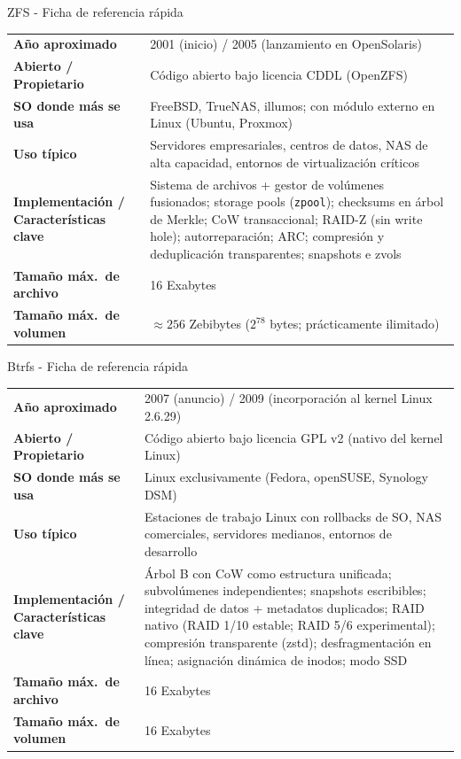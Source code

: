 \documentclass[12pt,letterpaper]{article}
\begin{document}
\begin{fichabox}{ZFS - Ficha de referencia rápida}
  \begin{tabular}{>{\bfseries}p{4.5cm} p{9cm}}
    Año aproximado & 2001 (inicio) / 2005 (lanzamiento en OpenSolaris) \\[4pt]
    Abierto / Propietario & Código abierto bajo licencia CDDL (OpenZFS) \\[4pt]
    SO donde más se usa & FreeBSD, TrueNAS, illumos; con módulo externo en Linux (Ubuntu, Proxmox) \\[4pt]
    Uso típico & Servidores empresariales, centros de datos, NAS de alta capacidad, entornos de virtualización críticos \\[4pt]
    Implementación / Características clave & Sistema de archivos + gestor de volúmenes fusionados; storage pools (\texttt{zpool}); checksums en árbol de Merkle; CoW transaccional; RAID-Z (sin write hole); autorreparación; ARC; compresión y deduplicación transparentes; snapshots e zvols \\[4pt]
    Tamaño máx.\ de archivo & 16 Exabytes \\[4pt]
    Tamaño máx.\ de volumen & $\approx 256$ Zebibytes ($2^{78}$ bytes; prácticamente ilimitado) \\
  \end{tabular}
\end{fichabox}

\bigskip

\begin{fichabox}{Btrfs - Ficha de referencia rápida}
  \begin{tabular}{>{\bfseries}p{4.5cm} p{9cm}}
    Año aproximado & 2007 (anuncio) / 2009 (incorporación al kernel Linux 2.6.29) \\[4pt]
    Abierto / Propietario & Código abierto bajo licencia GPL v2 (nativo del kernel Linux) \\[4pt]
    SO donde más se usa & Linux exclusivamente (Fedora, openSUSE, Synology DSM) \\[4pt]
    Uso típico & Estaciones de trabajo Linux con rollbacks de SO, NAS comerciales, servidores medianos, entornos
    de desarrollo \\[4pt]
    Implementación / Características clave & Árbol B con CoW como estructura unificada; subvolúmenes
    independientes; snapshots escribibles; integridad de datos + metadatos duplicados; RAID nativo (RAID 1/10
    estable; RAID 5/6 experimental); compresión transparente (zstd); desfragmentación en línea; asignación
    dinámica de inodos; modo SSD \\[4pt]
    Tamaño máx.\ de archivo & 16 Exabytes \\[4pt]
    Tamaño máx.\ de volumen & 16 Exabytes \\
  \end{tabular}
\end{fichabox}
\end{document}
